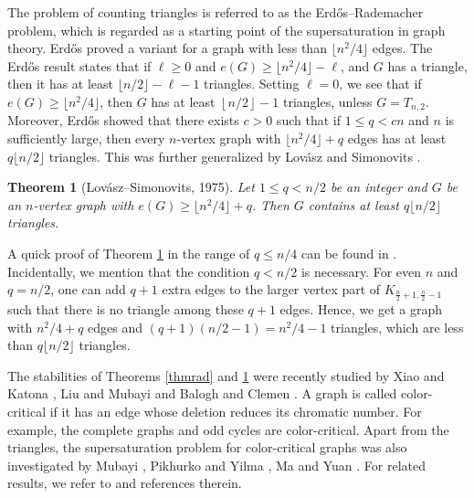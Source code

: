 \documentclass[11pt]{article}
\newtheorem{theorem}{Theorem}[section]
\begin{document}
The problem of counting triangles  is referred to as the Erd\H{o}s--Rademacher problem, 
which is regarded as a starting point of the supersaturation in graph theory.  
Erd\H{o}s \cite{Erdos1964} proved a variant  
for a graph with less than $\lfloor n^2/4\rfloor$ edges.  
The Erd\H{o}s result states that 
 if $\ell \ge 0$ and $ e(G) \ge  \lfloor {n^2}/{4} \rfloor - \ell$, 
 and $G$ has a triangle, 
then it has at least $\lfloor {n}/{2}\rfloor - \ell -1$ triangles. 
Setting $\ell =0$, 
we see that 
if $e(G)\ge \lfloor {n^2}/{4} \rfloor$, then 
$G$ has at least $\left\lfloor {n}/{2} \right\rfloor -1$ triangles, 
unless $G=T_{n,2}$.  
Moreover, 
Erd\H{o}s \cite{Erd1962a,Erd1962b}
 showed that there exists $c>0$ such that if $1\le q<cn$ and $n$ is sufficiently large, then
 every $n$-vertex graph with $\lfloor n^2/4\rfloor +q$
 edges  has at least $q\lfloor {n}/{2}\rfloor$ triangles.
This was further generalized by 
Lov\'{a}sz and Simonovits \cite{LS1975,LS1983}. 

\begin{theorem}[Lov\'{a}sz--Simonovits, 1975] 
\label{thm-LS1975}
Let $1\le q < {n}/{2}$ be an integer 
and $G$ be an $n$-vertex graph with 
$ e(G)\ge \lfloor {n^2}/{4}  \rfloor + q$.  
Then $G$ contains at least $q \lfloor {n}/{2}\rfloor $ 
triangles. 
\end{theorem}


A quick proof of Theorem \ref{thm-LS1975} in the range of $q\le {n}/{4}$ can be found in 
\cite[page 302]{Bollobas78}. Incidentally, 
we mention that 
the condition $q< {n}/{2}$ is necessary. 
For even $n$ and $q = {n}/{2}$, one can add $q +1$ extra edges 
to the larger vertex part of $K_{\frac{n}{2}+1, \frac{n}{2}-1}$ such that there is no triangle 
among these $q+1$ edges. 
Hence, we get a graph with ${n^2}/{4} +q$ edges and $(q +1)({n}/{2} -1) = 
{n^2}/{4} -1$ triangles, which are less than $q \lfloor {n}/{2}\rfloor$ triangles.  


\medskip 
The stabilities of Theorems \ref{thmrad} and \ref{thm-LS1975} 
were recently studied by Xiao and Katona  \cite{XK2021}, 
Liu and Mubayi \cite{LM2022-Erd-Rad} and Balogh and 
Clemen \cite{BC2023}. 
A graph is called color-critical if it has an edge 
whose deletion reduces its chromatic number. 
For example, the complete graphs and odd cycles are color-critical. Apart from the triangles, 
the supersaturation problem for color-critical graphs was also 
investigated by Mubayi \cite{Mubayi2010}, Pikhurko and Yilma \cite{PY2017}, Ma and Yuan \cite{MY2023}. 
For related results, we refer to \cite{Rei2016,LPS2020} 
and references therein. 
\end{document}
